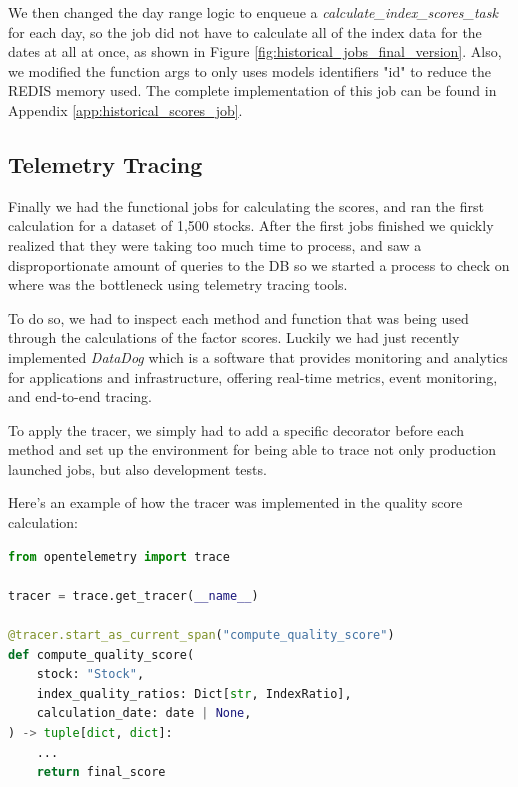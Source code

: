 \documentclass[11pt,english,a4paper,hidelinks]{book}
\begin{document}
\noindent We then changed the day range logic to enqueue a \textit{calculate\_index\_scores\_task} for each day, so the job did not have to calculate all of the index data for the dates at all at once, as shown in Figure \ref{fig:historical_jobs_final_version}. Also, we modified the function args to only uses models identifiers "id" to reduce the REDIS memory used. The complete implementation of this job can be found in Appendix \ref{app:historical_scores_job}.

\subsection{Telemetry Tracing}
Finally we had the functional jobs for calculating the scores, and ran the first calculation for a dataset of 1,500 stocks. After the first jobs finished we quickly realized that they were taking too much time to process, and saw a disproportionate amount of queries to the DB so we started a process to check on where was the bottleneck using telemetry tracing tools.

\vspace{0.5cm}
\noindent To do so, we had to inspect each method and function that was being used through the calculations of the factor scores. Luckily we had just recently implemented \textit{DataDog} which is a software that provides monitoring and analytics for applications and infrastructure, offering real-time metrics, event monitoring, and end-to-end tracing.

\vspace{0.5cm}
\noindent To apply the tracer, we simply had to add a specific decorator before each method and set up the environment for being able to trace not only production launched jobs, but also development tests.

\vspace{0.5cm}
\noindent Here's an example of how the tracer was implemented in the quality score calculation:

\begin{lstlisting}[language=Python, caption=Telemetry Tracing Implementation, label={lst:telemetry_tracing_implementation}]
from opentelemetry import trace

tracer = trace.get_tracer(__name__)

@tracer.start_as_current_span("compute_quality_score")
def compute_quality_score(
    stock: "Stock",
    index_quality_ratios: Dict[str, IndexRatio],
    calculation_date: date | None,
) -> tuple[dict, dict]:
    ...
    return final_score
\end{lstlisting}
\end{document}

